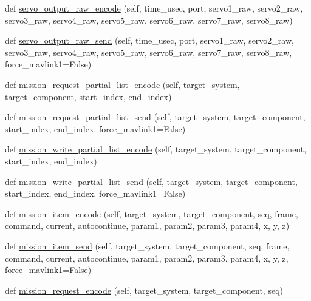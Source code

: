 \begin{DoxyCompactItemize}
\item 
def \hyperlink{classpymavlink_1_1dialects_1_1v10_1_1MAVLink_ae334ed08110bb079836368f856669953}{servo\+\_\+output\+\_\+raw\+\_\+encode} (self, time\+\_\+usec, port, servo1\+\_\+raw, servo2\+\_\+raw, servo3\+\_\+raw, servo4\+\_\+raw, servo5\+\_\+raw, servo6\+\_\+raw, servo7\+\_\+raw, servo8\+\_\+raw)
\item 
def \hyperlink{classpymavlink_1_1dialects_1_1v10_1_1MAVLink_aa74e7d44a7d791eeaff144b6fa046119}{servo\+\_\+output\+\_\+raw\+\_\+send} (self, time\+\_\+usec, port, servo1\+\_\+raw, servo2\+\_\+raw, servo3\+\_\+raw, servo4\+\_\+raw, servo5\+\_\+raw, servo6\+\_\+raw, servo7\+\_\+raw, servo8\+\_\+raw, force\+\_\+mavlink1=False)
\item 
def \hyperlink{classpymavlink_1_1dialects_1_1v10_1_1MAVLink_a963f4815c6b889b1c3cb6e4a4f17f992}{mission\+\_\+request\+\_\+partial\+\_\+list\+\_\+encode} (self, target\+\_\+system, target\+\_\+component, start\+\_\+index, end\+\_\+index)
\item 
def \hyperlink{classpymavlink_1_1dialects_1_1v10_1_1MAVLink_a14b1fe202d9709496e1e3f6062950bd9}{mission\+\_\+request\+\_\+partial\+\_\+list\+\_\+send} (self, target\+\_\+system, target\+\_\+component, start\+\_\+index, end\+\_\+index, force\+\_\+mavlink1=False)
\item 
def \hyperlink{classpymavlink_1_1dialects_1_1v10_1_1MAVLink_a3f1a00e9239f748f4aabecea583064f5}{mission\+\_\+write\+\_\+partial\+\_\+list\+\_\+encode} (self, target\+\_\+system, target\+\_\+component, start\+\_\+index, end\+\_\+index)
\item 
def \hyperlink{classpymavlink_1_1dialects_1_1v10_1_1MAVLink_a88807abea0324b85bdb0ebab662b068b}{mission\+\_\+write\+\_\+partial\+\_\+list\+\_\+send} (self, target\+\_\+system, target\+\_\+component, start\+\_\+index, end\+\_\+index, force\+\_\+mavlink1=False)
\item 
def \hyperlink{classpymavlink_1_1dialects_1_1v10_1_1MAVLink_a7ff6da75c8f4edb63050b90b16e8b857}{mission\+\_\+item\+\_\+encode} (self, target\+\_\+system, target\+\_\+component, seq, frame, command, current, autocontinue, param1, param2, param3, param4, x, y, z)
\item 
def \hyperlink{classpymavlink_1_1dialects_1_1v10_1_1MAVLink_aed58e7ad3caa4a8f6675224aa17574f3}{mission\+\_\+item\+\_\+send} (self, target\+\_\+system, target\+\_\+component, seq, frame, command, current, autocontinue, param1, param2, param3, param4, x, y, z, force\+\_\+mavlink1=False)
\item 
def \hyperlink{classpymavlink_1_1dialects_1_1v10_1_1MAVLink_a988b1fb4a08284f9badb42e7c2feddb2}{mission\+\_\+request\+\_\+encode} (self, target\+\_\+system, target\+\_\+component, seq)

\end{DoxyCompactItemize}
